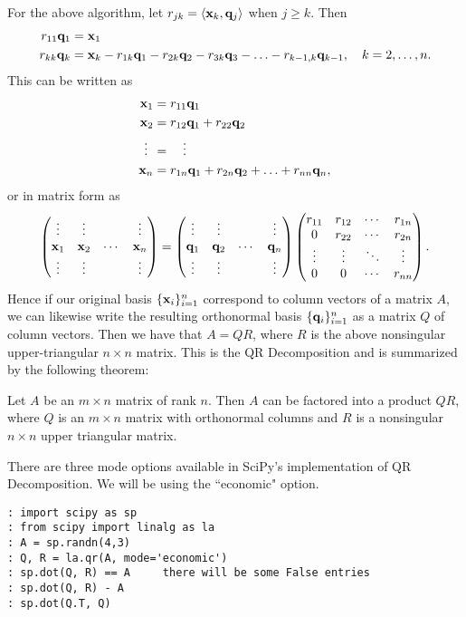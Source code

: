 For the above algorithm, let $r_{j k} = \langle {\bf x}_k, {\bf q}_j\rangle$ when $j \geq k$.  Then
\begin{align*}
r_{1 1} {\bf q}_1 &= {\bf x}_1\\
r_{k k} {\bf q}_k &= {\bf x}_k - r_{1 k} {\bf q}_1 - r_{2 k} {\bf q}_2 - r_{3 k} {\bf q}_3 -
\ldots - r_{k-1, k} {\bf q}_{k-1},\quad k=2,\ldots,n.
\end{align*}
This can be written as
\begin{align*}
{\bf x}_1 &= r_{1 1} {\bf q}_1\\
{\bf x}_2 &= r_{1 2} {\bf q}_1 + r_{2 2} {\bf q}_2\\
\vdots \:\: &= \quad \vdots\\
{\bf x}_n &= r_{1 n} {\bf q}_1 + r_{2 n} {\bf q}_2 + \ldots + r_{n n} {\bf q}_{n},
\end{align*}
or in matrix form as
\[
\begin{pmatrix}
\vdots & \vdots & & \vdots\\
{\bf x}_1 & {\bf x}_2 & \cdots & {\bf x}_n\\
\vdots & \vdots & & \vdots
\end{pmatrix}
=
\begin{pmatrix}
\vdots & \vdots & & \vdots\\
{\bf q}_1 & {\bf q}_2 & \cdots & {\bf q}_n\\
\vdots & \vdots & & \vdots
\end{pmatrix}
\begin{pmatrix}
r_{1 1} & r_{1 2} & \cdots & r_{1 n}\\
0 & r_{2 2} & \cdots & r_{2 n}\\
\vdots & \vdots & \ddots & \vdots\\
0 & 0 & \cdots & r_{n n}
\end{pmatrix}.
\]
Hence if our original basis $\{{\bf x}_i\}_{i=1}^n$ correspond to column
vectors of a matrix $A$, we can likewise write the resulting
orthonormal basis $\{{\bf q}_i\}_{i=1}^n$ as a matrix $Q$ of column
vectors.  Then we have that $A = Q R$, where $R$ is the above
nonsingular upper-triangular $n\times n$ matrix.  This is the QR
Decomposition and is summarized by the following theorem:
\vspace{5mm}
\begin{theorem}
Let $A$ be an $m\times n$ matrix of rank $n$.  Then $A$ can be
factored into a product $Q R$, where $Q$ is an $m\times n$ matrix
with orthonormal columns and $R$ is a nonsingular $n \times n$ upper
triangular matrix.
\end{theorem}


There are three mode options available in SciPy's implementation of QR Decomposition.  We will be using the ``economic" option.
\begin{lstlisting}[style=python]
: import scipy as sp
: from scipy import linalg as la
: A = sp.randn(4,3)
: Q, R = la.qr(A, mode='economic')
: sp.dot(Q, R) == A     there will be some False entries
: sp.dot(Q, R) - A
: sp.dot(Q.T, Q)
\end{lstlisting}

